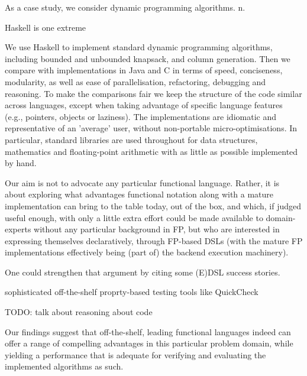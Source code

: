 As a
case study, we consider dynamic programming algorithms. n. 



Haskell is one extreme

We use Haskell to implement standard dynamic programming algorithms, including
bounded and unbounded knapsack, and column generation. Then we compare with
implementations in Java and C in terms of speed, conciseness, modularity, as
well as ease of parallelisation, refactoring, debugging and reasoning. To make
the comparisons fair we keep the structure of the code similar across
languages, except when taking advantage of specific language features (e.g.,
pointers, objects or laziness). The implementations are idiomatic and
representative of an 'average' user, without non-portable micro-optimisations.
In particular, standard libraries are used throughout for data structures,
mathematics and floating-point arithmetic with as little as possible
implemented by hand.

Our aim is not to advocate any particular functional language.
Rather, it is about exploring what advantages functional notation
along with a mature implementation can bring to the table today,
out of the box, and which, if judged useful enough, with only
a little extra effort could be made available to domain-experts
without any particular background in FP, but who are interested
in expressing themselves declaratively, through FP-based DSLs
(with the mature FP implementations effectively being (part of)
the backend execution machinery).

One could strengthen that argument by citing some (E)DSL
success stories.

sophisticated off-the-shelf proprty-based testing tools like QuickCheck


TODO: talk about reasoning about code

Our findings
suggest that off-the-shelf, leading functional languages indeed can offer a
range of compelling advantages in this particular problem domain, while
yielding a performance that is adequate for verifying and evaluating the
implemented algorithms as such.

